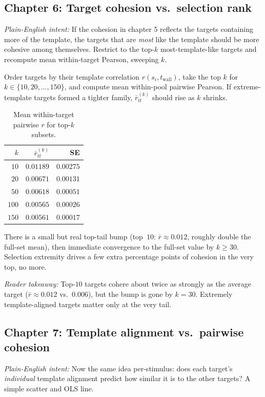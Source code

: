 \documentclass[11pt]{article}
\newcommand{\pintent}[1]{\par\medskip\noindent\textit{Plain-English intent:} #1\par\smallskip}
\newcommand{\pkey}[1]{\par\medskip\noindent\textit{Reader takeaway:} #1\par\smallskip}
\begin{document}
\subsection{Chapter 6: Target cohesion vs.\ selection rank}
\pintent{If the cohesion in chapter 5 reflects the targets containing more of
the template, the targets that are \emph{most} like the template should be
more cohesive among themselves. Restrict to the top-$k$ most-template-like
targets and recompute mean within-target Pearson, sweeping $k$.}

Order targets by their template correlation $r(s_i, t_{\text{wall}})$,
take the top $k$ for $k \in \{10, 20, \dots, 150\}$, and compute mean
within-pool pairwise Pearson.  If extreme-template targets formed a
tighter family, $\bar r_{tt}^{(k)}$ should rise as $k$ shrinks.

\begin{table}[H]
\centering
\caption{Mean within-target pairwise $r$ for top-$k$ subsets.}
\begin{tabular}{rrr}
\toprule
$k$ & $\bar r_{tt}^{(k)}$ & SE \\
\midrule
$10$  & $0.01189$ & $0.00275$ \\
$20$  & $0.00671$ & $0.00131$ \\
$50$  & $0.00618$ & $0.00051$ \\
$100$ & $0.00565$ & $0.00026$ \\
$150$ & $0.00561$ & $0.00017$ \\
\bottomrule
\end{tabular}
\end{table}

There is a small but real top-tail bump (top~$10$: $\bar r \approx 0.012$,
roughly double the full-set mean), then immediate convergence to the
full-set value by $k \ge 30$.  Selection extremity drives a few extra
percentage points of cohesion in the very top, no more.
\pkey{Top-$10$ targets cohere about twice as strongly as the average target
($\bar r \approx 0.012$ vs.\ $0.006$), but the bump is gone by $k=30$.
Extremely template-aligned targets matter only at the very tail.}

\subsection{Chapter 7: Template alignment vs.\ pairwise cohesion}
\pintent{Now the same idea per-stimulus: does each target's \emph{individual}
template alignment predict how similar it is to the other targets? A simple
scatter and OLS line.}
\end{document}
